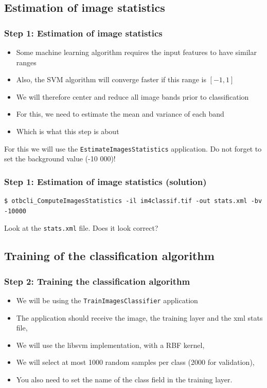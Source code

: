 \documentclass[8pt]{beamer}
\begin{document}
\subsection{Estimation of image statistics}

\begin{frame}
\frametitle{Step 1: Estimation of image statistics}

\begin{itemize}
\item Some machine learning algorithm requires the input features to have similar ranges
\item Also, the SVM algorithm will converge faster if this range is $[-1,1]$
\item We will therefore center and reduce all image bands prior to classification
\item For this, we need to estimate the mean and variance of each band
\item Which is what this step is about
\end{itemize}

For this we will use the \texttt{EstimateImagesStatistics} application. Do not forget to set the background value (-10 000)!

\end{frame}

\begin{frame}[fragile]
\frametitle{Step 1: Estimation of image statistics (solution)}

\begin{scriptsize}
\begin{verbatim}
$ otbcli_ComputeImagesStatistics -il im4classif.tif -out stats.xml -bv -10000
\end{verbatim}
\end{scriptsize}

Look  at the \texttt{stats.xml} file. Does it look correct?

\end{frame}

\subsection{Training of the classification algorithm}

\begin{frame}
\frametitle{Step 2: Training the classification algorithm}

\begin{itemize}
\item We will be using the \texttt{TrainImagesClassifier} application
\item The application should receive the image, the training layer and the xml stats file,
\item We will use the libsvm implementation, with a RBF kernel,
\item We will select at most 1000 random samples per class (2000 for validation),
\item You also need to set the name of the class field in the training layer.
\end{itemize}


\end{frame}
\end{document}
